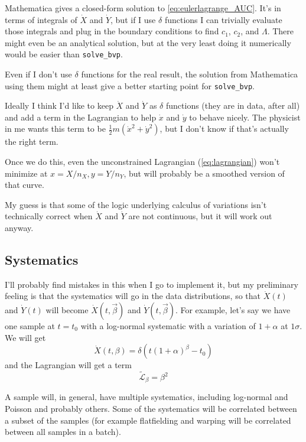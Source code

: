 \documentclass[11pt]{article}
\newcommand{\xdot}{\dot{x}}
\newcommand{\ydot}{\dot{y}}
\newcommand{\Xdot}{\dot{X}}
\newcommand{\Ydot}{\dot{Y}}
\begin{document}
Mathematica gives a closed-form solution to \cref{eq:eulerlagrange_AUC}.  It's in terms of integrals of \(\Xdot\) and \(\Ydot\), but if I use \(\delta\) functions I can trivially evaluate those integrals and plug in the boundary conditions to find \(c_1\), \(c_2\), and \(\Lambda\).  There might even be an analytical solution, but at the very least doing it numerically would be easier than \texttt{solve\_bvp}.

Even if I don't use \(\delta\) functions for the real result, the solution from Mathematica using them might at least give a better starting point for \texttt{solve\_bvp}.

Ideally I think I'd like to keep \(\Xdot\) and \(\Ydot\) as \(\delta\) functions (they are in data, after all) and add a term in the Lagrangian to help \(\xdot\) and \(\ydot\) to behave nicely.  The physicist in me wants this term to be \(\frac{1}{2}m(\xdot^2+\ydot^2)\), but I don't know if that's actually the right term.

Once we do this, even the unconstrained Lagrangian (\cref{eq:lagrangian}) won't minimize at \(x=X/n_X, y=Y/n_Y\), but will probably be a smoothed version of that curve.

My guess is that some of the logic underlying calculus of variations isn't technically correct when \(\Xdot\) and \(\Ydot\) are not continuous, but it will work out anyway.

\subsection{Systematics}
\label{sec:systematics}

I'll probably find mistakes in this when I go to implement it, but my preliminary feeling is that the systematics will go in the data distributions, so that \(\Xdot(t)\) and \(\Ydot(t)\) will become \(\Xdot(t,\vec{\beta})\) and \(\Ydot(t,\vec{\beta})\).  For example, let's say we have one sample at \(t=t_0\) with a log-normal systematic with a variation of \(1+\alpha\) at \(1\sigma\).  We will get
\begin{equation}
\Xdot(t,\beta)=\delta(t(1+\alpha)^\beta-t_0)
\end{equation}
and the Lagrangian will get a term
\begin{equation}
\mathcal{\tilde{L}_\beta}=\beta^2
\end{equation}

A sample will, in general, have multiple systematics, including log-normal and Poisson and probably others.  Some of the systematics will be correlated between a subset of the samples (for example flatfielding and warping will be correlated between all samples in a batch).
\end{document}
